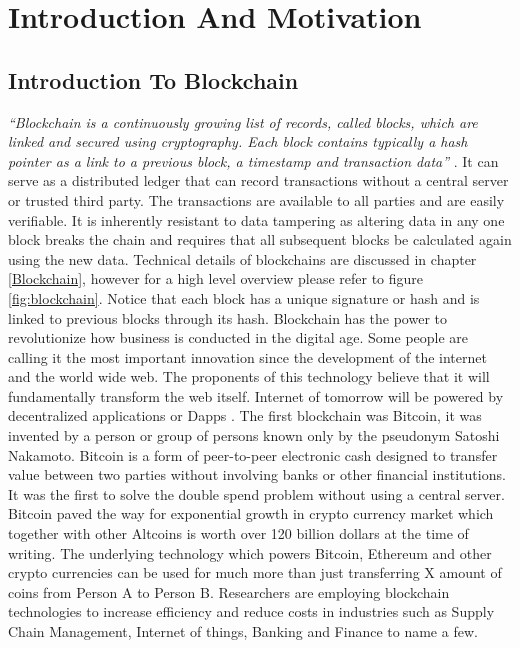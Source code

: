 \section{Introduction And Motivation}
\subsection{Introduction To Blockchain}
\textit{“Blockchain is a continuously growing list of records, called blocks, which are linked and secured using cryptography. Each block contains typically a hash pointer as a link to a previous block, a timestamp and transaction data”} \cite{wiki:001}. It can serve as a distributed ledger that can record transactions without a central server or trusted third party. The transactions are available to all parties and are easily verifiable. It is inherently resistant to data tampering as altering data in any one block breaks the chain and requires that all subsequent blocks be calculated again using the new data. Technical details of blockchains are discussed in chapter \ref{Blockchain}, however for a high level overview please refer to figure \ref{fig:blockchain}. Notice that each block has a unique signature or hash and is linked to previous blocks through its hash. Blockchain has the power to revolutionize how business is conducted in the digital age. Some people are calling it the most important innovation since the development of the internet and the world wide web. The proponents of this technology believe that it will fundamentally transform the web itself. Internet of tomorrow will be powered by decentralized applications or Dapps \cite{misc:020}. The first blockchain was Bitcoin, it was invented by a person or group of persons known only by the pseudonym Satoshi Nakamoto. Bitcoin is a form of peer-to-peer electronic cash designed to transfer value between two parties without involving banks or other financial institutions. It was the first to solve the double spend problem without using a central server. Bitcoin paved the way for exponential growth in crypto currency market which together with other Altcoins is worth over 120 billion dollars at the time of writing. The underlying technology which powers Bitcoin, Ethereum and other crypto currencies can be used for much more than just transferring X amount of coins from Person A to Person B. Researchers are employing blockchain technologies to increase efficiency and reduce costs in industries such as Supply Chain Management, Internet of things, Banking and Finance to name a few.

